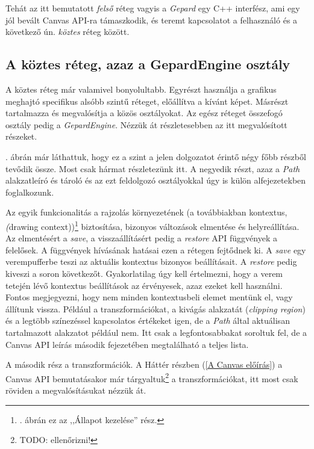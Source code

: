\documentclass[12pt]{report}
\theoremstyle{definition}
\newcommand{\inenglish}[1]{\textsl{#1}}
\newcommand{\func}[1]{{\textsl{#1}}}
\begin{document}
Tehát az itt bemutatott \emph{felső} réteg vagyis a \func{Gepard} egy C++
interfész, ami egy jól bevált Canvas API-ra támaszkodik, és teremt kapcsolatot
a felhasználó és a következő ún. \emph{köztes} réteg között.

    \subsection*{A köztes réteg, azaz a GepardEngine osztály}

A köztes réteg már valamivel bonyolultabb. Egyrészt használja a grafikus
meghajtó specifikus alsóbb szintű réteget, előállítva a kívánt képet. Másrészt
tartalmazza és megvalósítja a közös osztályokat. Az egész réteget összefogó
osztály pedig a \func{GepardEngine}. Nézzük át részletesebben az itt
megvalósított részeket.

. ábrán már láthattuk, hogy ez a szint a jelen dolgozatot
érintő négy főbb részből tevődik össze. Most csak hármat részletezünk itt. A
negyedik részt, azaz a \emph{Path} alakzatleíró és tároló és az ezt feldolgozó
osztályokkal úgy is külön alfejezetekben foglalkozunk.

Az egyik funkcionalitás a rajzolás környezetének (a továbbiakban kontextus,
\inenglish(drawing context))\footnote{. ábrán ez az
,,Állapot kezelése'' rész.} biztosítása, bizonyos változások elmentése és
helyreállítása. Az elmentésért a \func{save}, a visszaállításért pedig a
\func{restore} API függvények a felelősek. A függvények hívásának hatásai ezen
a rétegen fejtődnek ki. A \func{save} egy verempufferbe teszi az aktuális
kontextus bizonyos beállításait. A \func{restore} pedig kiveszi a soron
következőt. Gyakorlatilag úgy kell értelmezni, hogy a verem tetején lévő
kontextus beállítások az érvényesek, azaz ezeket kell használni. Fontos
megjegyezni, hogy nem minden kontextusbeli elemet mentünk el, vagy állítunk
vissza. Például a transzformációkat, a kivágás alakzatát (\inenglish{clipping
region}) és a legtöbb színezéssel kapcsolatos értékeket igen, de a \emph{Path}
által aktuálisan tartalmazott alakzatot például nem. Itt csak a
legfontosabbakat soroltuk fel, de a Canvas API leírás \cite{Cabanier:14:HCC}
második fejezetében megtalálható a teljes lista.

A második rész a transzformációk. A Háttér részben (\ref{A Canvas előírás}) a
Canvas API bemutatásakor már tárgyaltuk\footnote{TODO: ellenőrizni!} a
transzformációkat, itt most csak röviden a megvalósításukat nézzük át.
\end{document}
